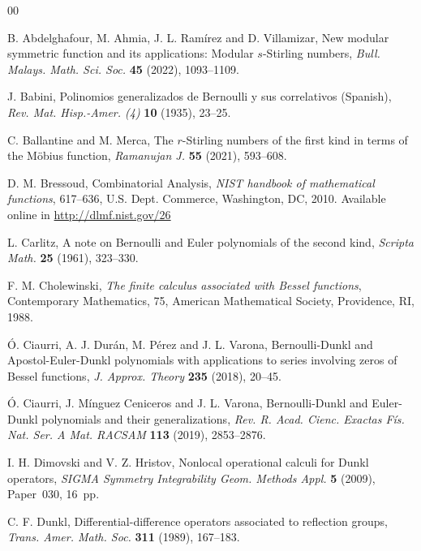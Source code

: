 \documentclass[11pt,a4paper]{article}
\theoremstyle{plain}
\theoremstyle{remark}
\begin{document}
\begin{thebibliography}{00}

\small

{B. Abdelghafour, M. Ahmia, J. L. Ram\'irez and D. Villamizar},
New modular symmetric function and its applications: Modular $s$-Stirling numbers,
\textit{Bull. Malays. Math. Sci. Soc.}
\textbf{45} (2022), 1093--1109.

{J. Babini},
Polinomios generalizados de Bernoulli y sus correlativos (Spanish),
\textit{Rev. Mat. Hisp.-Amer. (4)}
\textbf{10} (1935), 23--25.

{C. Ballantine and M. Merca},
The $r$-Stirling numbers of the first kind in terms of the M\"obius function,
\textit{Ramanujan J.}
\textbf{55} (2021), 593--608. 

D. M. Bressoud,
Combinatorial Analysis,
\textit{NIST handbook of mathematical functions},
617--636,
U.S. Dept. Commerce, Washington, DC, 2010.
Available online in \url{http://dlmf.nist.gov/26}

{L. Carlitz},
A note on Bernoulli and Euler polynomials of the second kind,
\textit{Scripta Math.}
\textbf{25} (1961), 323--330.

F. M. Cholewinski, 
\textit{The finite calculus associated with Bessel functions}, 
Contemporary Mathematics, 75, American Mathematical Society, Providence, RI, 1988.

\'O. Ciaurri, A. J. Dur\'an, M. P\'erez and J. L. Varona,
{Bernoulli-Dunkl and Apostol-Euler-Dunkl polynomials with applications to series involving zeros of Bessel functions},
\textit{J. Approx. Theory}
\textbf{235} (2018), 20--45.

\'O. Ciaurri, J. M\'inguez Ceniceros and J. L. Varona,
{Bernoulli-Dunkl and Euler-Dunkl polynomials and their generalizations},
\textit{Rev. R. Acad. Cienc. Exactas F\'is. Nat. Ser. A Mat. RACSAM}
\textbf{113} (2019), 2853--2876.

I. H. Dimovski and V. Z. Hristov,
Nonlocal operational calculi for Dunkl operators,
\textit{SIGMA Symmetry Integrability Geom. Methods Appl.}
\textbf{5} (2009), Paper~030, 16~pp.

C. F. Dunkl,
{Differential-difference operators associated to reflection groups},
\textit{Trans. Amer. Math. Soc.}
\textbf{311} (1989), 167--183.


\end{thebibliography}
\end{document}
